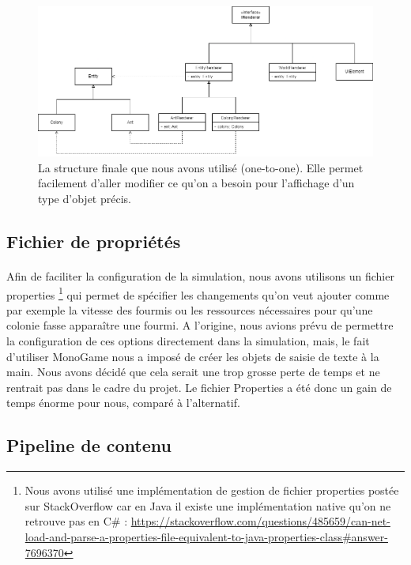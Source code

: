 \documentclass{EPUProjetDi}
\begin{document}
\begin{figure}[h]
    \centering
    \includegraphics[scale=0.5]{renderer_logic_2.png}
    \caption{La structure finale que nous avons utilisé (one-to-one). Elle permet facilement d'aller modifier ce qu'on a besoin pour l'affichage d'un type d'objet précis.}
    \label{fig:renderer_logic_2}
\end{figure}

\subsection{Fichier de propriétés}
\paragraph{}
Afin de faciliter la configuration de la simulation, nous avons utilisons un fichier properties
\footnote{Nous avons utilisé une implémentation de gestion de fichier properties postée sur StackOverflow car en Java il existe une implémentation native qu'on ne retrouve pas en C\# : 
\url{https://stackoverflow.com/questions/485659/can-net-load-and-parse-a-properties-file-equivalent-to-java-properties-class\#answer-7696370}}
qui permet de spécifier les changements qu'on veut ajouter comme par exemple la vitesse des fourmis
ou les ressources nécessaires pour qu'une colonie fasse apparaître une fourmi. A l'origine, nous avions prévu de permettre la configuration de ces options directement dans la simulation, mais,
le fait d'utiliser MonoGame nous a imposé de créer les objets de saisie de texte à la main. Nous avons décidé que cela serait une trop grosse perte de temps et ne rentrait pas dans 
le cadre du projet. Le fichier Properties a été donc un gain de temps énorme pour nous, comparé à l'alternatif.

\subsection{Pipeline de contenu}
\end{document}
